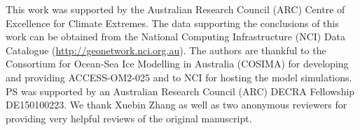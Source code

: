 \documentclass[draft,linenumbers]{agujournal2018}
\begin{document}
\acknowledgments
This work was supported by the Australian Research Council (ARC) Centre of Excellence for Climate Extremes. The data supporting the conclusions of this work can be obtained from the National Computing Infrastructure (NCI) Data Catalogue (\url{http://geonetwork.nci.org.au}). The authors are thankful to the Consortium for Ocean-Sea Ice Modelling in Australia (COSIMA) for developing and providing ACCESS-OM2-025 and to NCI for hosting the model simulations. PS was supported by an Australian Research Council (ARC) DECRA Fellowship DE150100223. We thank Xuebin Zhang as well as two anonymous reviewers for providing very helpful reviews of the original manuscript.
 

\end{document}
